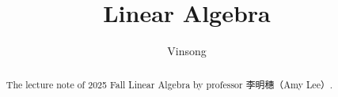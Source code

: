 \documentclass[a4paper]{report}
\author{Vinsong}
\title{Linear Algebra}
\begin{document}
\maketitle

\begin{abstract}
    The lecture note of 2025 Fall Linear Algebra by professor 李明穗（Amy Lee）.
\end{abstract}

\newpage

\tableofcontents

\setcounter{chapter}{-1}

\end{document}

